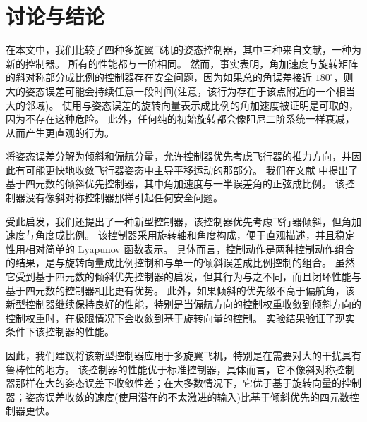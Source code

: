 \section{讨论与结论}
\label{secConclusion}

在本文中，我们比较了四种多旋翼飞机的姿态控制器，其中三种来自文献，一种为新的控制器。 
所有的性能都与一阶相同。
然而，事实表明，角加速度与旋转矩阵的斜对称部分成比例的控制器存在安全问题，因为如果总的角误差接近 $180^\circ$，则大的姿态误差可能会持续任意一段时间(注意，该行为存在于该点附近的一个相当大的邻域)。
使用与姿态误差的旋转向量表示成比例的角加速度被证明是可取的，因为不存在这种危险。
此外，任何纯的初始旋转都会像阻尼二阶系统一样衰减，从而产生更直观的行为。

将姿态误差分解为倾斜和偏航分量，允许控制器优先考虑飞行器的推力方向，并因此有可能更快地收敛飞行器姿态中主导平移运动的那部分。
我们在文献 \cite{brescianini2013nonlinear} 中提出了基于四元数的倾斜优先控制器，其中角加速度与一半误差角的正弦成比例。
该控制器没有像斜对称控制器那样引起任何安全问题。

受此启发，我们还提出了一种新型控制器，该控制器优先考虑飞行器倾斜，但角加速度与角度成比例。
该控制器采用旋转轴和角度构成，便于直观描述，并且稳定性用相对简单的 Lyapunov 函数表示。 
具体而言，控制动作是两种控制动作组合的结果，是与旋转向量成比例控制和与单一的倾斜误差成比例控制的组合。
虽然它受到基于四元数的倾斜优先控制器的启发，但其行为与之不同，而且闭环性能与基于四元数的控制器相比更有优势。
此外，如果倾斜的优先级不高于偏航角，该新型控制器继续保持良好的性能，特别是当偏航方向的控制权重收敛到倾斜方向的控制权重时，在极限情况下会收敛到基于旋转向量的控制。
实验结果验证了现实条件下该控制器的性能。 

因此，我们建议将该新型控制器应用于多旋翼飞机，特别是在需要对大的干扰具有鲁棒性的地方。 
该控制器的性能优于标准控制器，具体而言，它不像斜对称控制器那样在大的姿态误差下收敛性差；在大多数情况下，它优于基于旋转向量的控制器；姿态误差收敛的速度(使用潜在的不太激进的输入)比基于倾斜优先的四元数控制器更快。


 
